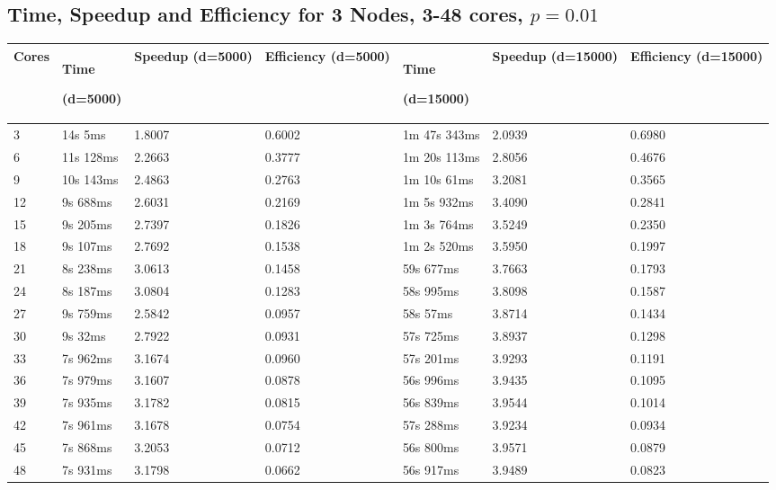 \documentclass[12pt]{article}
\begin{document}
\begin{appendices}
\vspace{-0.5cm}\subsection{Time, Speedup and Efficiency for 3 Nodes, 3-48 cores, $p=0.01$}\vspace{-0.5cm}
\footnotesize{\label{sec:threeNodes}
\begin{center}
\begin{tabular}{|p{1cm}|p{2.5cm}|p{2cm}|p{2cm}|p{2.5cm}|p{2cm}|p{2cm}|}
\hline
Cores	& Time\par(d=5000)	& Speedup (d=5000)	& Efficiency (d=5000)	& Time \par(d=15000)	& Speedup (d=15000)	& Efficiency (d=15000)  \\
\hline
3 & 14s 5ms &	1.8007 &	0.6002 & 1m 47s 343ms &	2.0939 & 0.6980 \\
6 & 11s 128ms &	2.2663 &	0.3777 & 1m 20s 113ms &	2.8056 & 0.4676 \\
9 & 10s 143ms &	2.4863 &	0.2763 & 1m 10s 61ms &	3.2081 & 0.3565 \\
12 & 9s 688ms &	2.6031 &	0.2169 & 1m 5s 932ms &	3.4090 & 0.2841 \\
15 & 9s 205ms &	2.7397 &	0.1826 & 1m 3s 764ms &	3.5249 & 0.2350 \\
18 & 9s 107ms &	2.7692 &	0.1538 & 1m 2s 520ms &	3.5950 & 0.1997 \\
21 & 8s 238ms &	3.0613 &	0.1458 & 59s 677ms &	3.7663 & 0.1793 \\
24 & 8s 187ms &	3.0804 &	0.1283 & 58s 995ms &	3.8098 & 0.1587 \\
27 & 9s 759ms &	2.5842 &	0.0957 & 58s 57ms &	3.8714 & 0.1434 \\
30 & 9s 32ms &	2.7922 &	0.0931 & 57s 725ms &	3.8937 & 0.1298 \\
33 & 7s 962ms &	3.1674 &	0.0960 & 57s 201ms &	3.9293 & 0.1191 \\
36 & 7s 979ms &	3.1607 &	0.0878 & 56s 996ms &	3.9435 & 0.1095 \\
39 & 7s 935ms &	3.1782 &	0.0815 & 56s 839ms &	3.9544 & 0.1014 \\
42 & 7s 961ms &	3.1678 &	0.0754 & 57s 288ms &	3.9234 & 0.0934 \\
45 & 7s 868ms &	3.2053 &	0.0712 & 56s 800ms &	3.9571 & 0.0879 \\
48 & 7s 931ms &	3.1798 &	0.0662 & 56s 917ms &	3.9489 & 0.0823 \\
\hline
\end{tabular}
\end{center}}


\end{appendices}
\end{document}
